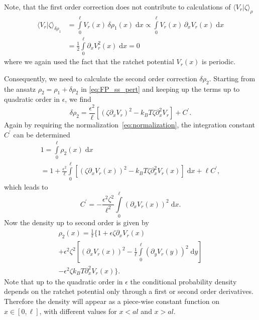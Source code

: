 \documentclass[aps,pre,twocolumn,showpacs,showkeys,superscriptaddress,floatfix]{revtex4-1}
\newcommand{\rmd}{{\mathrm d}}
\begin{document}
Note, that the first order correction does not contribute to calculations of $\langle V_r | \zeta \rangle_\rho$ 
\begin{align*}
\langle V_r | \zeta \rangle_{\delta \rho_1} 
&= \int\limits_0^\ell V_r(x) \, \delta\rho_1(x) \; \rmd x
\propto \int\limits_0^\ell V_r(x) \, \partial_x V_r(x) \; \rmd x \\
&= \frac{1}{2} \int\limits_0^\ell \partial_x V_r^2(x) \; \rmd x 
= 0
\end{align*}
where we again used the fact that the ratchet potential $V_r(x)$ is periodic.

Consequently, we need to calculate the second order correction $\delta\rho_2$. 
Starting from the ansatz $\rho_2 = \rho_1 + \delta\rho_2$ in \eqref{eq:FP_ss_pert} and keeping up the terms up to quadratic order in $\epsilon$, we find
\begin{equation*}
\delta\rho_2 = \frac{ \epsilon^2 }{ \ell } \left[ \left( \zeta \partial_x V_r \right)^2 - k_B T \zeta \partial_x^2 V_r \right] + C^\prime .
\end{equation*}
Again by requiring the normalization~\eqref{eq:normalization}, the integration constant $C^\prime$ can be determined
\begin{multline*}
1 = \int\limits_0^\ell \rho_2(x) \; \rmd x 
\\
= 1  
+ \frac{\epsilon^2}{ \ell } \int\limits_0^\ell \left[ \left( \zeta \partial_x V_r(x) \right)^2 - k_B T \zeta \partial_x^2 V_r(x) \right] \; \rmd x 
+ \ell C^\prime ,
\end{multline*}
which leads to
\begin{equation}
C^\prime = - \frac{\epsilon^2 \zeta^2}{ \ell^2 } \int\limits_0^\ell \left( \partial_x V_r(x) \right)^2 \; \rmd x . 
\end{equation}
Now the density up to second order is given by
\begin{multline*}
\rho_2(x)  
= \frac{1}{\ell} \Biggl\{ 1  + \epsilon \zeta \partial_x V_r(x) \\
+ \epsilon^2 \zeta^2 \left[ \left( \partial_x V_r(x) \right)^2 - \frac{1}{\ell} \int\limits_0^\ell \left( \partial_y V_r(y) \right)^2 \; \rmd y \right] 
\\
- \epsilon^2 \zeta k_B T \partial_x^2 V_r(x)  
\Biggr\} .
\end{multline*}
Note that up to the quadratic order in $\epsilon$ the conditional probability density depends on the ratchet potential only through a first or second order derivatives. 
Therefore the density will appear as a piece-wise constant function on $x \in [0,\ell]$, with different values for $x < a l$ and $x > a l $. 
\end{document}
